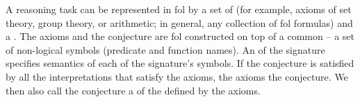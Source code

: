A reasoning task can be represented in \gls{fol} by a set of  (for example, axioms of set theory, group theory, or arithmetic; in general, any collection of \gls{fol} formulas) and a .
The axioms and the conjecture are \gls{fol}  constructed on top of a common  -- a set of non-logical symbols (predicate and function names).
An  of the signature specifies semantics of each of the signature's symbols.
If the conjecture is satisfied by all the interpretations that satisfy the axioms,
the axioms  the conjecture.
We then also call the conjecture a  of the  defined by the axioms.


